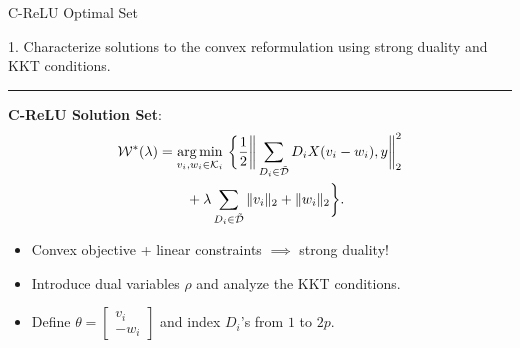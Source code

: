 \documentclass[usenames,dvipsnames,mathserif,notheorems]{beamer}
\newcommand{\horizontalrule}{
	{
			\vspace{-0.5em}
			\center \rule{\textwidth}{0.1em}
			\vspace{-0.2em}
		}
}
\newcommand{\good}[1]{\textcolor{good}{#1}}
\begin{document}
\begin{frame}{C-ReLU Optimal Set}

	{\raggedright
		\large
		1. Characterize solutions to the \good{convex reformulation}
		using strong duality and KKT conditions.
		\vspace{3ex}
		\pause
	}

	\horizontalrule

	\textbf{C-ReLU Solution Set}:
	\[
		\begin{aligned}
			\mathcal{W}^*(\lambda) & =
			\mathop{\rm arg\,min}_{v_i, w_i \in \mathcal{K}_i} \, \bigg\{
			\frac 1 2 \bigg\|\sum_{D_i \in \tilde {\mathcal{D}}} D_i X (v_i - w_i), y\bigg\|_2^2                    \\
			                & \quad \quad + \lambda\sum_{D_i \in \tilde {\mathcal{D}}}\|v_i\|_2+\|w_i\|_2
			\bigg\}.
		\end{aligned}
	\]

	\pause

	\begin{itemize}
		\item Convex objective + linear constraints \( \implies \) strong duality!
		      \pause
		\item Introduce dual variables \( \rho \) and analyze the KKT conditions.
		      \pause
		\item Define
		      \(
		      \theta =
		      \begin{bmatrix}
			      v_i \\
			      -w_i
		      \end{bmatrix}
		      \)
		      and index \( D_i \)'s from \( 1 \) to \( 2p \).

	\end{itemize}

\end{frame}
\end{document}
